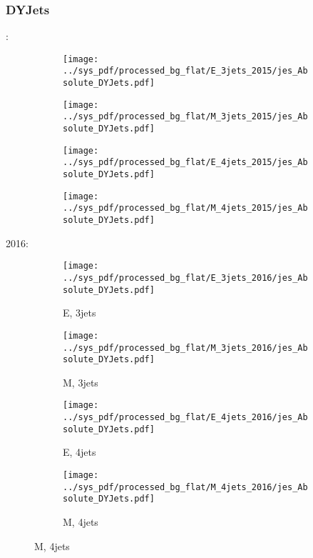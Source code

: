 \documentclass{beamer}
\begin{document}
\begin{frame}
\frametitle{DYJets}
\fontsize{5}{1}:
\begin{figure}
\centering
\begin{subfigure}[b]{0.24\textwidth}
\texttt{[image: ../sys\_pdf/processed\_bg\_flat/E\_3jets\_2015/jes\_Absolute\_DYJets.pdf]}
\end{subfigure}
\begin{subfigure}[b]{0.24\textwidth}
\texttt{[image: ../sys\_pdf/processed\_bg\_flat/M\_3jets\_2015/jes\_Absolute\_DYJets.pdf]}
\end{subfigure}
\begin{subfigure}[b]{0.24\textwidth}
\texttt{[image: ../sys\_pdf/processed\_bg\_flat/E\_4jets\_2015/jes\_Absolute\_DYJets.pdf]}
\end{subfigure}
\begin{subfigure}[b]{0.24\textwidth}
\texttt{[image: ../sys\_pdf/processed\_bg\_flat/M\_4jets\_2015/jes\_Absolute\_DYJets.pdf]}
\end{subfigure}
\end{figure}
2016:
\begin{figure}
\centering
\begin{subfigure}[b]{0.24\textwidth}
\texttt{[image: ../sys\_pdf/processed\_bg\_flat/E\_3jets\_2016/jes\_Absolute\_DYJets.pdf]}
\captionsetup{font=tiny}
\caption{E, 3jets}
\end{subfigure}
\begin{subfigure}[b]{0.24\textwidth}
\texttt{[image: ../sys\_pdf/processed\_bg\_flat/M\_3jets\_2016/jes\_Absolute\_DYJets.pdf]}
\captionsetup{font=tiny}
\caption{M, 3jets}
\end{subfigure}
\begin{subfigure}[b]{0.24\textwidth}
\texttt{[image: ../sys\_pdf/processed\_bg\_flat/E\_4jets\_2016/jes\_Absolute\_DYJets.pdf]}
\captionsetup{font=tiny}
\caption{E, 4jets}
\end{subfigure}
\begin{subfigure}[b]{0.24\textwidth}
\texttt{[image: ../sys\_pdf/processed\_bg\_flat/M\_4jets\_2016/jes\_Absolute\_DYJets.pdf]}
\captionsetup{font=tiny}
\caption{M, 4jets}
\end{subfigure}
\end{figure}
\end{frame}
\end{document}
